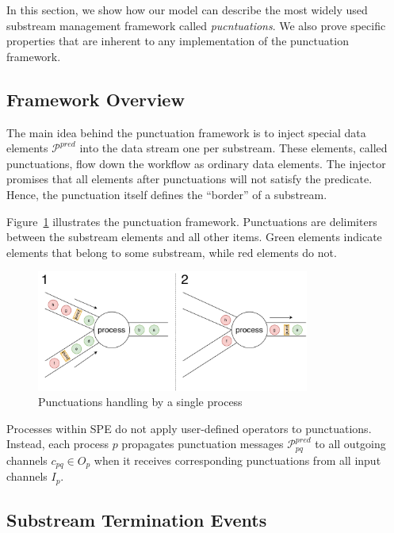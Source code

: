 In this section, we show how our model can describe the most widely used substream management framework called {\em pucntuations}. We also prove specific properties that are inherent to any implementation of the punctuation framework. 

\subsection{Framework Overview}

The main idea behind the punctuation framework is to inject special data elements $\mathcal{P}^{pred}$ into the data stream one per substream. These elements, called punctuations, flow down the workflow as ordinary data elements. The injector promises that all elements after punctuations will not satisfy the predicate. Hence, the punctuation itself defines the ``border'' of a substream.

Figure~\ref{punctuations_scheme} illustrates the punctuation framework. Punctuations are delimiters between the substream elements and all other items. Green elements indicate elements that belong to some substream, while red elements do not.

\begin{figure}[t]
  \centering
  \includegraphics[width=0.80\textwidth]{Chapters/SubstreamConsistency/pics/punctuations-scheme.pdf}
  \caption{Punctuations handling by a single process}
  \label{punctuations_scheme}
\end{figure}

Processes within SPE do not apply user-defined operators to punctuations. Instead, each process $p$ propagates punctuation messages $\mathcal{P}_{pq}^{pred}$ to all outgoing channels $c_{pq} \in O_p$  when it receives corresponding punctuations from all input channels $I_p$.

\subsection{Substream Termination Events}

